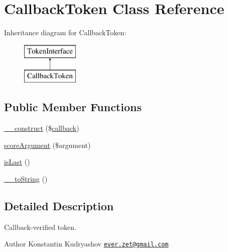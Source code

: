 \hypertarget{class_prophecy_1_1_argument_1_1_token_1_1_callback_token}{}\section{Callback\+Token Class Reference}
\label{class_prophecy_1_1_argument_1_1_token_1_1_callback_token}
Inheritance diagram for Callback\+Token\+:\begin{figure}[H]
\begin{center}
\leavevmode
\includegraphics[height=2.000000cm]{class_prophecy_1_1_argument_1_1_token_1_1_callback_token}
\end{center}
\end{figure}
\subsection*{Public Member Functions}
\begin{DoxyCompactItemize}
\item 
\mbox{\hyperlink{class_prophecy_1_1_argument_1_1_token_1_1_callback_token_aae70a2214e4c3d274a97b54e983b5fdf}{\+\_\+\+\_\+construct}} (\$\mbox{\hyperlink{_functions_8php_ae2242eb47799ca6a822b022dc1bd1ac9}{callback}})
\item 
\mbox{\hyperlink{class_prophecy_1_1_argument_1_1_token_1_1_callback_token_a8d5bf47ab6eaa935458d5ad160e52822}{score\+Argument}} (\$argument)
\item 
\mbox{\hyperlink{class_prophecy_1_1_argument_1_1_token_1_1_callback_token_ac72b8349b1340887fc1af30eca2b951c}{is\+Last}} ()
\item 
\mbox{\hyperlink{class_prophecy_1_1_argument_1_1_token_1_1_callback_token_a7516ca30af0db3cdbf9a7739b48ce91d}{\+\_\+\+\_\+to\+String}} ()
\end{DoxyCompactItemize}


\subsection{Detailed Description}
Callback-\/verified token.

\begin{DoxyAuthor}{Author}
Konstantin Kudryashov \href{mailto:ever.zet@gmail.com}{\tt ever.\+zet@gmail.\+com} 
\end{DoxyAuthor}


